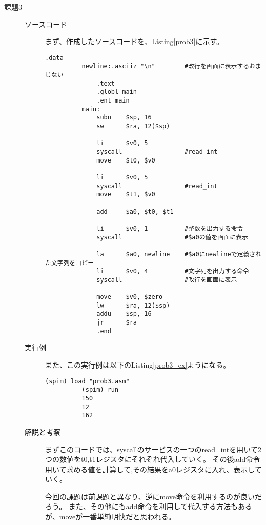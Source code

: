 \documentclass{jsarticle}
\begin{document}
\begin{description}
      \item[課題3]
      \begin{description}
          \item[ソースコード]
          まず、作成したソースコードを、Listing\ref{prob3}に示す。
          \begin{lstlisting}[caption=課題3のソースコード, label=prob3]
              .data
          newline:.asciiz "\n"        #改行を画面に表示するおまじない
              .text
              .globl main
              .ent main
          main:
              subu    $sp, 16
              sw      $ra, 12($sp)

              li      $v0, 5
              syscall                 #read_int
              move    $t0, $v0

              li      $v0, 5
              syscall                 #read_int
              move    $t1, $v0

              add     $a0, $t0, $t1

              li      $v0, 1          #整数を出力する命令
              syscall                 #$a0の値を画面に表示

              la      $a0, newline    #$a0にnewlineで定義された文字列をコピー
              li      $v0, 4          #文字列を出力する命令
              syscall                 #改行を画面に表示

              move    $v0, $zero
              lw      $ra, 12($sp)
              addu    $sp, 16
              jr      $ra
              .end
          \end{lstlisting}

          \item[実行例]
          また、この実行例は以下のListing\ref{prob3_ex}ようになる。
          \begin{lstlisting}[caption=課題3の実行例, label=prob3_ex]
          (spim) load "prob3.asm"
          (spim) run
          150
          12
          162
          \end{lstlisting}

          \item[解説と考察]
          まずこのコードでは、syscallのサービスの一つのread\_intを用いて2つの数値をt0,t1レジスタにそれぞれ代入していく。
          その後add命令用いて求める値を計算して,その結果をa0レジスタに入れ、表示していく。

          今回の課題は前課題と異なり、逆にmove命令を利用するのが良いだろう。
          また、その他にもadd命令を利用して代入する方法もあるが、moveが一番単純明快だと思われる。
          \\
      \end{description}


\end{description}
\end{document}
